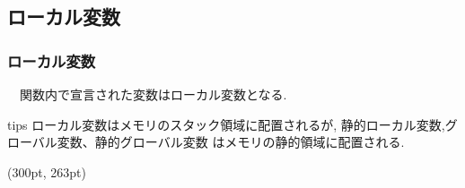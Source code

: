 \documentclass[dvipdfmx]{beamer}
\begin{document}
\subsection{ローカル変数}
\begin{frame}[label=53]
    \frametitle{ローカル変数}
    　関数内で宣言された変数はローカル変数となる.
    \begin{table}
    \centering
    \end{table}
    \begin{itembox}[l]{tips}
        ローカル変数はメモリのスタック領域に配置されるが,
            静的ローカル変数,グローバル変数、静的グローバル変数
            はメモリの静的領域に配置される.
    \end{itembox}
    \begin{textblock*}{0.3\linewidth}(300pt, 263pt)
    \hyperlink{52}{}
    \space
    \hyperlink{54}{}
    \end{textblock*}
\end{frame}
\end{document}
